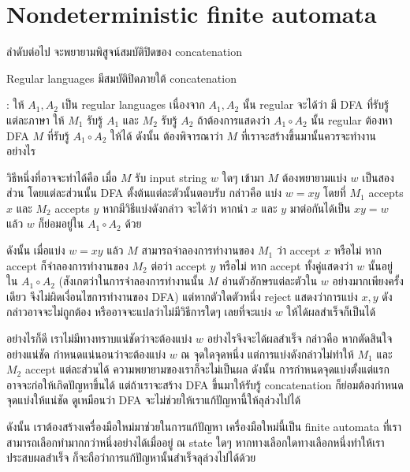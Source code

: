 \section{Nondeterministic finite automata}

ลำดับต่อไป จะพยายามพิสูจน์สมบัติปิดของ concatenation
%
\begin{theorem}
Regular languages มีสมบัติปิดภายใต้ concatenation

: ให้ $A_1,A_2$ เป็น regular languages \enskip เนื่องจาก $A_1,A_2$ นั้น regular จะได้ว่า มี DFA ที่รับรู้แต่ละภาษา \enskip ให้ $M_1$ รับรู้ $A_1$ และ $M_2$ รับรู้ $A_2$ \enskip ถ้าต้องการแสดงว่า $A_1\circ A_2$ นั้น regular ต้องหา DFA $M$ ที่รับรู้ $A_1\circ A_2$ ให้ได้ \enskip ดังนั้น ต้องพิจารณาว่า $M$ ที่เราจะสร้างขึ้นมานั้นควรจะทำงานอย่างไร

วิธีหนึ่งที่อาจจะทำได้คือ เมื่อ $M$ รับ input string $w$ ใดๆ เข้ามา $M$ ต้องพยายามแบ่ง $w$ เป็นสองส่วน โดยแต่ละส่วนนั้น DFA ตั้งต้นแต่ละตัวนั้นตอบรับ กล่าวคือ แบ่ง $w=xy$ โดยที่ $M_1$ accepts $x$ และ $M_2$ accepts $y$ \enskip หากมีวิธีแบ่งดังกล่าว จะได้ว่า หากนำ $x$ และ $y$ มาต่อกันได้เป็น $xy=w$ แล้ว $w$ ก็ย่อมอยู่ใน $A_1\circ A_2$ ด้วย

ดังนั้น เมื่อแบ่ง $w=xy$ แล้ว $M$ สามารถจำลองการทำงานของ $M_1$ ว่า accept $x$ หรือไม่ หาก accept ก็จำลองการทำงานของ $M_2$ ต่อว่า accept $y$ หรือไม่ หาก accept ทั้งคู่แสดงว่า $w$ นั้นอยู่ใน $A_1\circ A_2$ (สังเกตว่าในการจำลองการทำงานนั้น $M$ อ่านตัวอักษรแต่ละตัวใน $w$ อย่างมากเพียงครั้งเดียว จึงไม่ผิดเงื่อนไขการทำงานของ DFA) \enskip แต่หากตัวใดตัวหนึ่ง reject แสดงว่าการแบ่ง $x,y$ ดังกล่าวอาจจะไม่ถูกต้อง หรืออาจจะแปลว่าไม่มีวิธีการใดๆ เลยที่จะแบ่ง $w$ ให้ได้ผลสำเร็จก็เป็นได้

อย่างไรก็ดี เราไม่มีทางทราบแน่ชัดว่าจะต้องแบ่ง $w$ อย่างไรจึงจะได้ผลสำเร็จ กล่าวคือ หากตัดสินใจอย่างแน่ชัด กำหนดแน่นอนว่าจะต้องแบ่ง $w$ ณ จุดใดจุดหนึ่ง แต่การแบ่งดังกล่าวไม่ทำให้ $M_1$ และ $M_2$ accept แต่ละส่วนได้ ความพยายามของเราก็จะไม่เป็นผล \enskip ดังนั้น การกำหนดจุดแบ่งตั้งแต่แรกอาจจะก่อให้เกิดปัญหาขึ้นได้ \enskip แต่ถ้าเราจะสร้าง DFA ขึ้นมาให้รับรู้ concatenation ก็ย่อมต้องกำหนดจุดแบ่งให้แน่ชัด \enskip ดูเหมือนว่า DFA จะไม่ช่วยให้เราแก้ปัญหานี้ให้ลุล่วงไปได้

ดังนั้น เราต้องสร้างเครื่องมือใหม่มาช่วยในการแก้ปัญหา \enskip เครื่องมือใหม่นี้เป็น finite automata ที่เราสามารถเลือกทำมากกว่าหนึ่งอย่างได้เมื่ออยู่ ณ state ใดๆ \enskip หากทางเลือกใดทางเลือกหนึ่งทำให้เราประสบผลสำเร็จ ก็จะถือว่าการแก้ปัญหานั้นสำเร็จลุล่วงไปได้ด้วย
\end{theorem}

